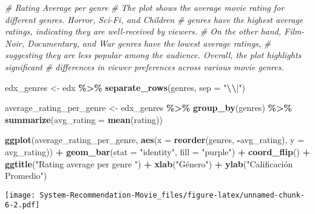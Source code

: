 \documentclass[
]{article}
\newenvironment{Shaded}{\begin{snugshade}}{\end{snugshade}}
\newcommand{\AttributeTok}[1]{\textcolor[rgb]{0.13,0.29,0.53}{#1}}
\newcommand{\CommentTok}[1]{\textcolor[rgb]{0.56,0.35,0.01}{\textit{#1}}}
\newcommand{\FunctionTok}[1]{\textcolor[rgb]{0.13,0.29,0.53}{\textbf{#1}}}
\newcommand{\NormalTok}[1]{#1}
\newcommand{\OtherTok}[1]{\textcolor[rgb]{0.56,0.35,0.01}{#1}}
\newcommand{\SpecialCharTok}[1]{\textcolor[rgb]{0.81,0.36,0.00}{\textbf{#1}}}
\newcommand{\StringTok}[1]{\textcolor[rgb]{0.31,0.60,0.02}{#1}}
\begin{document}
\begin{Shaded}
\begin{Highlighting}[]
\CommentTok{\# Rating Average per genre }
\CommentTok{\# The plot shows the average movie rating for different genres. Horror, Sci{-}Fi, and Children }
\CommentTok{\# genres have the highest average ratings, indicating they are well{-}received by viewers. }
\CommentTok{\# On the other hand, Film{-}Noir, Documentary, and War genres have the lowest average ratings,}
\CommentTok{\# suggesting they are less popular among the audience. Overall, the plot highlights significant}
\CommentTok{\# differences in viewer preferences across various movie genres.}

\NormalTok{edx\_genres }\OtherTok{\textless{}{-}}\NormalTok{ edx }\SpecialCharTok{\%\textgreater{}\%}
  \FunctionTok{separate\_rows}\NormalTok{(genres, }\AttributeTok{sep =} \StringTok{"}\SpecialCharTok{\textbackslash{}\textbackslash{}}\StringTok{|"}\NormalTok{)}

\NormalTok{average\_rating\_per\_genre }\OtherTok{\textless{}{-}}\NormalTok{ edx\_genres }\SpecialCharTok{\%\textgreater{}\%}
  \FunctionTok{group\_by}\NormalTok{(genres) }\SpecialCharTok{\%\textgreater{}\%}
  \FunctionTok{summarize}\NormalTok{(}\AttributeTok{avg\_rating =} \FunctionTok{mean}\NormalTok{(rating))}

\FunctionTok{ggplot}\NormalTok{(average\_rating\_per\_genre, }\FunctionTok{aes}\NormalTok{(}\AttributeTok{x =} \FunctionTok{reorder}\NormalTok{(genres, }\SpecialCharTok{{-}}\NormalTok{avg\_rating), }\AttributeTok{y =}\NormalTok{ avg\_rating)) }\SpecialCharTok{+}
  \FunctionTok{geom\_bar}\NormalTok{(}\AttributeTok{stat =} \StringTok{"identity"}\NormalTok{, }\AttributeTok{fill =} \StringTok{"purple"}\NormalTok{) }\SpecialCharTok{+}
  \FunctionTok{coord\_flip}\NormalTok{() }\SpecialCharTok{+}
  \FunctionTok{ggtitle}\NormalTok{(}\StringTok{"Rating average per genre "}\NormalTok{) }\SpecialCharTok{+}
  \FunctionTok{xlab}\NormalTok{(}\StringTok{"Género"}\NormalTok{) }\SpecialCharTok{+}
  \FunctionTok{ylab}\NormalTok{(}\StringTok{"Calificación Promedio"}\NormalTok{)}
\end{Highlighting}
\end{Shaded}

\texttt{[image: System-Recommendation-Movie\_files/figure-latex/unnamed-chunk-6-2.pdf]}
\end{document}
